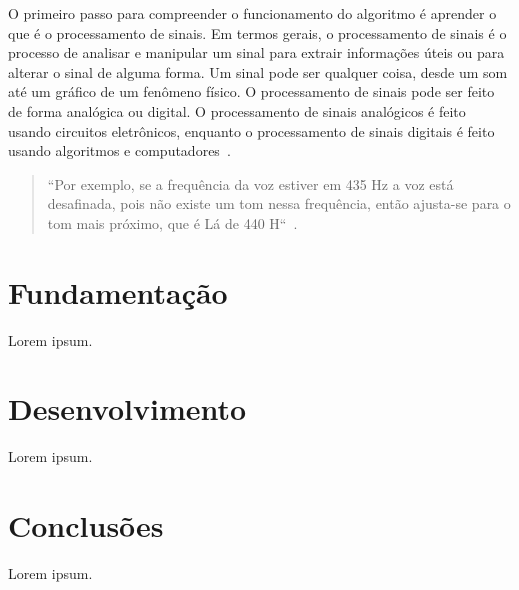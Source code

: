 \documentclass{sbrt}
\begin{document}
O primeiro passo para compreender o funcionamento do algoritmo é aprender o que é o processamento de sinais. Em termos gerais, o processamento de sinais é o processo de analisar e manipular um sinal para extrair informações úteis ou para alterar o sinal de alguma forma. Um sinal pode ser qualquer coisa, desde um som até um gráfico de um fenômeno físico. O processamento de sinais pode ser feito de forma analógica ou digital. O processamento de sinais analógicos é feito usando circuitos eletrônicos, enquanto o processamento de sinais digitais é feito usando algoritmos e computadores~\cite{prandoni2008signal}.

\begin{quote} ``Por exemplo, se a frequência da voz estiver em 435 Hz a voz está desafinada, pois não existe um tom nessa frequência, então ajusta-se para o tom mais próximo, que é Lá de 440 H``~\cite{deimplementaccao}. \end{quote}


\section{Fundamentação}

Lorem ipsum.


\section{Desenvolvimento}

Lorem ipsum.


\section{Conclusões}

Lorem ipsum.





\end{document}
